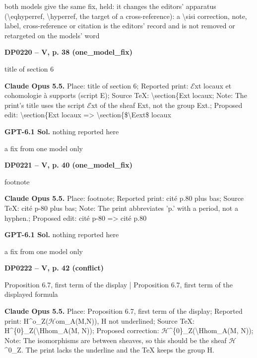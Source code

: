 both models give the same fix, held: it changes the editors' apparatus (\textbackslash{}eqhyperref, \textbackslash{}hyperref, the target of a cross-reference): a \textbackslash{}sisi correction, note, label, cross-reference or citation is the editors' record and is not removed or retargeted on the models' word\par
\par\noindent\hypertarget{DP0220}{}\textbf{DP0220 -- V, p. 38 (one\_model\_fix)}\par
title of section 6\par
\textbf{Claude Opus 5.5.} Place: title of section 6; Reported print: \ensuremath{\mathcal{E}}xt locaux et cohomologie à supports (script E); Source TeX: \textbackslash{}section\{Ext locaux; Note: The print's title uses the script \ensuremath{\mathcal{E}}xt of the sheaf Ext, not the group Ext.; Proposed edit: \textbackslash{}section\{Ext locaux =\allowbreak > \textbackslash{}section\{\$\textbackslash{}Eext\$ locaux\par
\textbf{GPT-6.1 Sol.} nothing reported here\par
a fix from one model only\par
\par\noindent\hypertarget{DP0221}{}\textbf{DP0221 -- V, p. 40 (one\_model\_fix)}\par
footnote\par
\textbf{Claude Opus 5.5.} Place: footnote; Reported print: cité p.80 plus bas; Source TeX: cité p-80 plus bas; Note: The print abbreviates 'p.' with a period, not a hyphen.; Proposed edit: cité p-80 =\allowbreak > cité p.80\par
\textbf{GPT-6.1 Sol.} nothing reported here\par
a fix from one model only\par
\par\noindent\hypertarget{DP0222}{}\textbf{DP0222 -- V, p. 42 (conflict)}\par
Proposition 6.7, first term of the display | Proposition 6.7, first term of the displayed formula\par
\textbf{Claude Opus 5.5.} Place: Proposition 6.7, first term of the display; Reported print: H\textasciicircum{}o\_Z(\ensuremath{\mathcal{H}}om\_A(M,N)), H not underlined; Source TeX: H\textasciicircum{}\{0\}\_Z(\textbackslash{}Hhom\_A(M, N)); Proposed correction: \ensuremath{\mathcal{H}}\textasciicircum{}\{0\}\_Z(\textbackslash{}Hhom\_A(M, N)); Note: The isomorphisms are between sheaves, so this should be the sheaf \ensuremath{\mathcal{H}}\textasciicircum{}0\_Z. The print lacks the underline and the TeX keeps the group H.\par
